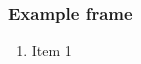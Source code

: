 \documentclass[aspectratio=43]{beamer}
\begin{document}
\begin{frame}
\maketitle
\end{frame}

\begin{frame} 
\frametitle{Example frame}
\begin{enumerate}
	\item Item 1	
\end{enumerate}
\end{frame}
\end{document}
